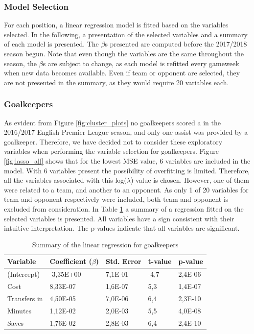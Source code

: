 \subsubsection{Model Selection}
For each position, a linear regression model is fitted based on the variables selected. In the following, a presentation of the selected variables and a summary of each model is presented. The $\beta$s presented are computed before the 2017/2018 season begun. Note that even though the variables are the same throughout the season, the $\beta$s are subject to change, as each model is refitted every gameweek when new data becomes available. Even if team or opponent are selected, they are not presented in the summary, as they would require 20 variables each.

\newpar

\subsubsection{Goalkeepers}
As evident from Figure \ref{fig:cluster_plots} no goalkeepers scored a in the 2016/2017 English Premier League season, and only one assist was provided by a goalkeeper. Therefore, we have decided not to consider these exploratory variables when performing the variable selection for goalkeepers. Figure \ref{fig:lasso_all} shows that for the lowest MSE value, 6 variables are included in the model. With 6 variables present the possibility of overfitting is limited. Therefore, all the variables associated with this log($\lambda$)-value is chosen. However, one of them were related to a team, and another to an opponent. As only 1 of 20 variables for team and opponent respectively were included, both team and opponent is excluded from consideration. In Table \ref{tab:coef_GLK} a summary of a regression fitted on the selected variables is presented. All variables have a sign consistent with their intuitive interpretation. The p-values indicate that all variables are significant. 

\begin{table}[H]
\centering
\begin{tabular}{|l|l|l|l|l|}
\hline
Variable     & Coefficient ($\beta$) & Std. Error & t-value & p-value \\ \hline
(Intercept)  & -3,35E+00    & 7,1E-01    & -4,7    & 2,4E-06               \\
Cost         & 8,33E-07 & 1,6E-07    & 5,3     & 1,4E-07               \\
Transfers in & 4,50E-05 & 7,0E-06    & 6,4     & 2,3E-10               \\
Minutes      & 1,12E-02 & 2,0E-03    & 5,5     & 4,0E-08               \\
Saves        & 1,76E-02 & 2,8E-03    & 6,4     & 2,4E-10
\\
\hline
\end{tabular}
\caption{Summary of the linear regression for goalkeepers}
\label{tab:coef_GLK}
\end{table}

